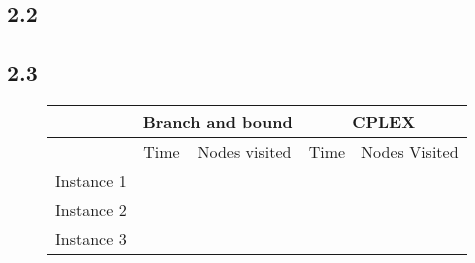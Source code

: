 \documentclass[12pt]{article}
\begin{document}
\subsection*{2.2}

\subsection*{2.3}

\begin{figure}
\begin{tabular}{|c | c | c | c | c |}
\hline
& \multicolumn{2}{|c|}{Branch and bound} & \multicolumn{2}{|c|}{CPLEX} \\
\hline 
& Time & Nodes visited & Time & Nodes Visited\\
\hline
Instance 1 & & & & \\
\hline
Instance 2 & & & & \\
\hline
Instance 3 & & & & \\
\hline 
\end{tabular}
\end{figure}
\end{document}
